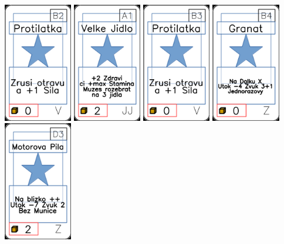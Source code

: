 \documentclass[a4paper]{article}
\begin{document}
	\includegraphics[width=3.0cm]{img-1_66}
	\includegraphics[width=3.0cm]{img-1_30}
	\includegraphics[width=3.0cm]{img-1_67}
	\includegraphics[width=3.0cm]{img-1_98}
	\includegraphics[width=3.0cm]{img-1_107}
\end{document}
